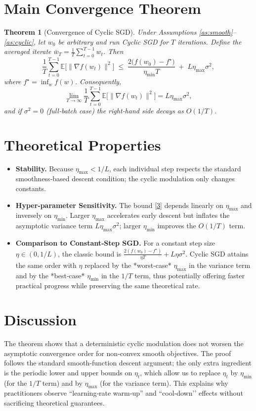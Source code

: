 \documentclass{article}
\newtheorem{theorem}{Theorem}
\newcommand{\E}{\mathbb{E}}
\begin{document}
\section*{Main Convergence Theorem}
\begin{theorem}[Convergence of Cyclic SGD]\label{thm:main}
Under Assumptions \ref{as:smooth}–\ref{as:cyclic}, let $w_{0}$ be arbitrary and run Cyclic SGD for $T$ iterations.
Define the averaged iterate $\bar w_{T}= \frac{1}{T}\sum_{t=0}^{T-1} w_{t}$.
Then
\[
\frac{1}{T}\sum_{t=0}^{T-1}\E\!\big[\|\nabla f(w_{t})\|^{2}\big]
\;\le\;
\frac{2\big(f(w_{0})-f^{\star}\big)}{\eta_{\min}T}
\;+\;
L\eta_{\max}\sigma^{2},
\tag{3}
\]
where $f^{\star}= \inf_{w}f(w)$.
Consequently,
\[
\lim_{T\to\infty}\frac{1}{T}\sum_{t=0}^{T-1}\E\!\big[\|\nabla f(w_{t})\|^{2}\big]=L\eta_{\max}\sigma^{2},
\]
and if $\sigma^{2}=0$ (full‑batch case) the right‑hand side decays as $O(1/T)$.
\end{theorem}

\section*{Theoretical Properties}
\begin{itemize}[leftmargin=*]
\item \textbf{Stability.} Because $\eta_{\max}<1/L$, each individual step respects the standard
smoothness‑based descent condition; the cyclic modulation only changes constants.
\item \textbf{Hyper‑parameter Sensitivity.} The bound \eqref{3} depends linearly on $\eta_{\max}$
and inversely on $\eta_{\min}$. Larger $\eta_{\max}$ accelerates early descent but inflates the
asymptotic variance term $L\eta_{\max}\sigma^{2}$; larger $\eta_{\min}$ improves the $O(1/T)$ term.
\item \textbf{Comparison to Constant‑Step SGD.} For a constant step size $\eta\in(0,1/L)$,
the classic bound is $\frac{2(f(w_{0})-f^{\star})}{\eta T}+L\eta\sigma^{2}$.  
Cyclic SGD attains the same order with $\eta$ replaced by the *worst‑case* $\eta_{\max}$ in the
variance term and by the *best‑case* $\eta_{\min}$ in the $1/T$ term, thus potentially offering
faster practical progress while preserving the same theoretical rate.
\end{itemize}

\section*{Discussion}
The theorem shows that a deterministic cyclic modulation does not worsen the
asymptotic convergence order for non‑convex smooth objectives.  The proof follows the
standard smooth‑function descent argument; the only extra ingredient is the
periodic lower and upper bounds on $\eta_{t}$, which allow us to replace $\eta_{t}$ by
$\eta_{\min}$ (for the $1/T$ term) and by $\eta_{\max}$ (for the variance term).  This
explains why practitioners observe “learning‑rate warm‑up” and “cool‑down’’ effects
without sacrificing theoretical guarantees.
\end{document}
